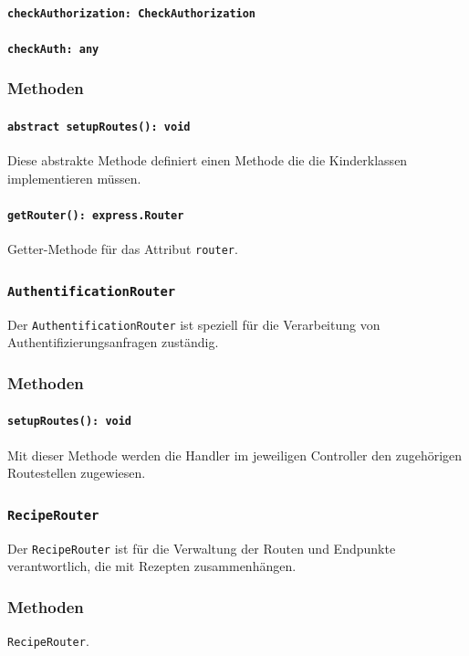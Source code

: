 \documentclass{entwurfsheft}
\begin{document}
\paragraph{\texttt{checkAuthorization: CheckAuthorization}} %
\paragraph{\texttt{checkAuth: any}} %

\subsubsection*{Methoden}
\paragraph{\texttt{abstract setupRoutes(): void}}
Diese abstrakte Methode definiert einen Methode die die Kinderklassen implementieren müssen.
\paragraph{\texttt{getRouter(): express.Router}}
Getter-Methode für das Attribut \texttt{router}.


\subsubsection{\texttt{AuthentificationRouter}}\label{sec:AuthentificationRouter}
Der \texttt{AuthentificationRouter} ist speziell für die Verarbeitung von Authentifizierungsanfragen zuständig.
\subsubsection*{Methoden}
\paragraph{\texttt{setupRoutes(): void}}
Mit dieser Methode werden die Handler im jeweiligen Controller den zugehörigen Routestellen zugewiesen.

\subsubsection{\texttt{RecipeRouter}}\label{sec:RecipeRouter}
Der \texttt{RecipeRouter} ist für die Verwaltung der Routen und Endpunkte verantwortlich, die mit Rezepten zusammenhängen.
\subsubsection*{Methoden}
\texttt{RecipeRouter}.
\end{document}
